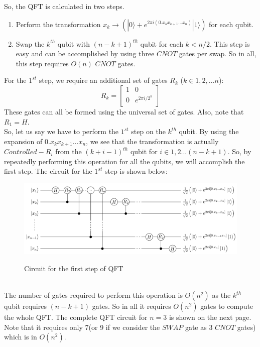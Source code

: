 So, the QFT is calculated in two steps.
\begin{enumerate}
\item Perform the transformation $x_k \rightarrow \left( |0\rangle + e^{2\pi i (0.x_{k}x_{k+1}...x_n)} |1\rangle \right)$ for each qubit.
\item Swap the $k^{th}$ qubit with $(n-k+1)^{th}$ qubit for each $k < n/2$. This step is easy and can be accomplished by using three $CNOT$ gates per swap. So in all, this step requires $O(n)$ $CNOT$ gates.
\end{enumerate}
For the $1^{st}$ step, we require an additional set of gates $R_k$ ($k \in {1,2,...n}$):
\begin{equation}
R_k = \left[ {\begin{array}{cc}
   1 & 0\\
   0 & e^{2\pi i/2^k}\\
  \end{array} } \right]
\end{equation}
These gates can all be formed using the universal set of gates. Also, note that $R_1 = H$.\\
So, let us say we have to perform the $1^{st} $ step on the $k^{th}$ qubit. By using the expansion of $0.x_{k}x_{k+1}...x_n$, we see that the transformation is actually $Controlled-R_i$ from the $(k+i-1)^{th}$ qubit for $ i \in {1,2...(n-k+1)}$.  So, by repeatedly performing this operation for all the qubits, we will accomplish the first step. The circuit for the $1^{st}$ step is shown below: 
\begin{figure}[h]
\centering
\includegraphics[width=1\textwidth]{images/qft.png}
\label{qft}
\caption{Circuit for the first step of QFT}
\end{figure}
\\The number of gates required to perform this operation is $O(n^2)$ as the $k^{th}$ qubit requires $(n-k+1)$ gates. So in all it requires $O(n^2)$ gates to compute the whole QFT. The complete QFT circuit for $n=3$ is shown on the next page. Note that it requires only 7(or 9 if we consider the $SWAP$ gate as 3 $CNOT$ gates) which is in $O(n^2)$.
